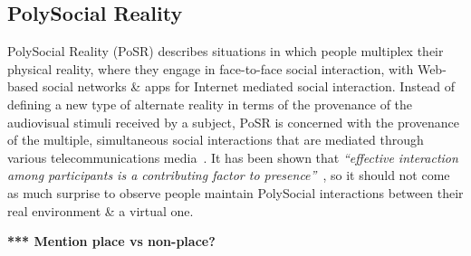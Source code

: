 
\subsection{PolySocial Reality}

PolySocial Reality (PoSR) describes situations in which people multiplex their physical reality, where they engage in face-to-face social interaction, with Web-based social networks \& apps for Internet mediated social interaction. Instead of defining a new type of alternate reality in terms of the provenance of the audiovisual stimuli received by a subject, PoSR is concerned with the provenance of the multiple, simultaneous social interactions that are mediated through various telecommunications media~\cite{Applin2012}. It has been shown that \textit{``effective interaction among participants is a contributing factor to presence''}~\cite{Terashima2001}, so it should not come as much surprise to observe people maintain PolySocial interactions between their real environment \& a virtual one.

\textbf{*** Mention place vs non-place?}







